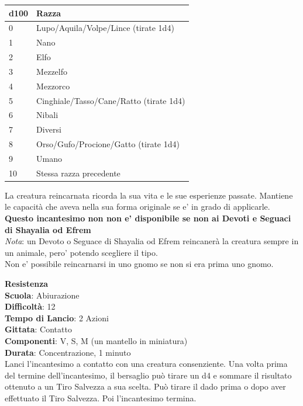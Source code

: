 \begin{multicols}{2}
\medskip
\begin{tabular}{ll}
\textbf{d100} &\textbf{Razza}\\
\toprule
0 & Lupo/Aquila/Volpe/Lince (tirate 1d4)\\
1&Nano\\
2&Elfo\\
3&Mezzelfo\\
4&Mezzorco\\
5&Cinghiale/Tasso/Cane/Ratto (tirate 1d4)\\
6&Nibali\\
7&Diversi\\
8&Orso/Gufo/Procione/Gatto (tirate 1d4)\\
9&Umano\\
10&Stessa razza precedente\\
\end{tabular}

La creatura reincarnata ricorda la sua vita e le sue esperienze passate. Mantiene le capacità che aveva nella sua forma originale se e' in grado di applicarle.\\
\textbf{Questo incantesimo non non e' disponibile se non ai Devoti e Seguaci di Shayalia od Efrem}\\
\textit{Nota}: un Devoto o Seguace di Shayalia od Efrem reincanerà la creatura sempre in un animale, pero' potendo scegliere il tipo.\\
Non e' possibile reincarnarsi in uno gnomo se non si era prima uno gnomo.

\medskip\textbf{Resistenza}\\
\textbf{Scuola}: Abiurazione\\
\textbf{Difficoltà}: 12\\
\textbf{Tempo di Lancio}: 2 Azioni\\
\textbf{Gittata}: Contatto\\
\textbf{Componenti}: V, S, M (un mantello in miniatura)\\
\textbf{Durata}: Concentrazione, 1 minuto\\
Lanci l'incantesimo a contatto con una creatura consenziente. Una volta prima del termine dell'incantesimo, il bersaglio può tirare un d4 e sommare il risultato ottenuto a un Tiro Salvezza a sua scelta. Può tirare il dado prima o dopo aver effettuato il Tiro Salvezza. Poi l'incantesimo termina.


\end{multicols}
